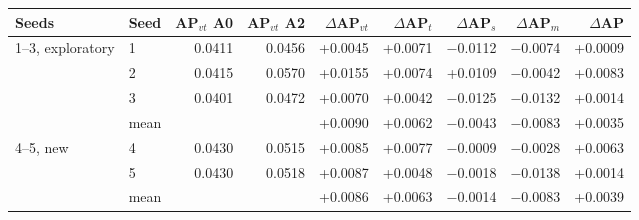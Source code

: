\begin{tabular}{llrrrrrrr}
\toprule
Seeds & Seed & AP$_{vt}$ A0 & AP$_{vt}$ A2 & $\Delta$AP$_{vt}$ & $\Delta$AP$_t$ & $\Delta$AP$_s$ & $\Delta$AP$_m$ & $\Delta$AP \\
\midrule
1--3, exploratory & 1 & 0.0411 & 0.0456 & +0.0045 & +0.0071 & $-$0.0112 & $-$0.0074 & +0.0009 \\
 & 2 & 0.0415 & 0.0570 & +0.0155 & +0.0074 & +0.0109 & $-$0.0042 & +0.0083 \\
 & 3 & 0.0401 & 0.0472 & +0.0070 & +0.0042 & $-$0.0125 & $-$0.0132 & +0.0014 \\
 & mean & & & +0.0090 & +0.0062 & $-$0.0043 & $-$0.0083 & +0.0035 \\
\midrule
4--5, new & 4 & 0.0430 & 0.0515 & +0.0085 & +0.0077 & $-$0.0009 & $-$0.0028 & +0.0063 \\
 & 5 & 0.0430 & 0.0518 & +0.0087 & +0.0048 & $-$0.0018 & $-$0.0138 & +0.0014 \\
 & mean & & & +0.0086 & +0.0063 & $-$0.0014 & $-$0.0083 & +0.0039 \\
\bottomrule
\end{tabular}

